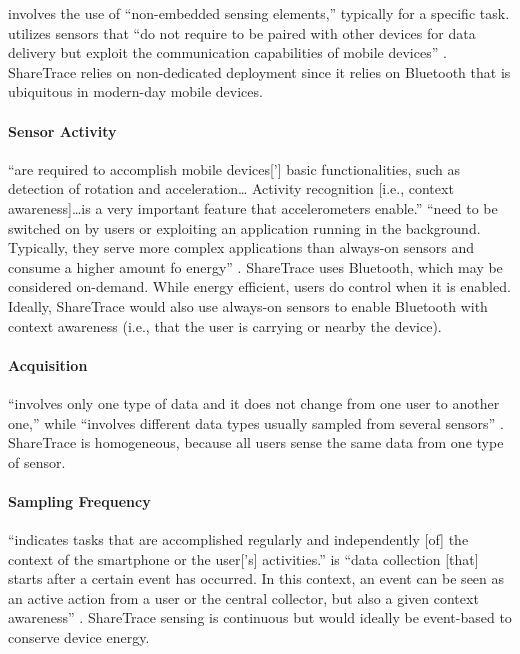  involves the use of ``non-embedded sensing elements,'' typically for a specific task.  utilizes sensors that ``do not require to be paired with other devices for data delivery but exploit the communication capabilities of mobile devices'' \citep{Capponi2019}. ShareTrace relies on non-dedicated deployment since it relies on Bluetooth that is ubiquitous in modern-day mobile devices.

\paragraph{Sensor Activity}

 ``are required to accomplish mobile devices['] basic functionalities, such as detection of rotation and acceleration{\ldots} Activity recognition [i.e., context awareness]{\ldots}is a very important feature that accelerometers enable.''  ``need to be switched on by users or exploiting an application running in the background. Typically, they serve more complex applications than always-on sensors and consume a higher amount fo energy'' \citep{Capponi2019}. ShareTrace uses Bluetooth, which may be considered on-demand. While energy efficient, users do control when it is enabled. Ideally, ShareTrace would also use always-on sensors to enable Bluetooth with context awareness (i.e., that the user is carrying or nearby the device).

\paragraph{Acquisition}

 ``involves only one type of data and it does not change from one user to another one,'' while  ``involves different data types usually sampled from several sensors'' \citep{Capponi2019}. ShareTrace is homogeneous, because all users sense the same data from one type of sensor.

\paragraph{Sampling Frequency}

 ``indicates tasks that are accomplished regularly and independently [of] the context of the smartphone or the user['s] activities.''  is ``data collection [that] starts after a certain event has occurred. In this context, an event can be seen as an active action from a user or the central collector, but also a given context awareness'' \citep{Capponi2019}. ShareTrace sensing is continuous but would ideally be event-based to conserve device energy.

